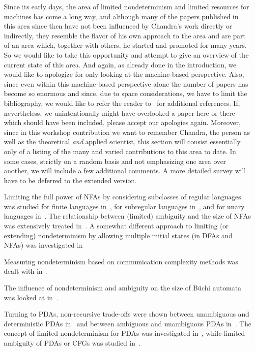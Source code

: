 \documentclass[copyright]{eptcs}
\begin{document}
Since its early days, the area of limited nondeterminism 
and limited resources for machines has come a long way, 
and although many of the papers published in this area since 
then have not been influenced by Chandra's work 
directly or indirectly, they resemble the flavor 
of his own approach to the area and are part of an area which, 
together with others, he started and promoted for many years. 
So we would like to take this opportunity and attempt to 
give an overview of the current state of this area. 
And again, as already done in the introduction, we would like to 
apologize for only looking at the machine-based perspective. 
Also, since even within this machine-based perspective 
alone the number of papers has become so enormous and since, due to space considerations, we have to limit the bibliography,
we would like to refer the reader to~\cite{Dassow09,GoldstineKKLMW02} for additional references. If, nevertheless,
we unintentionally might have overlooked a paper here or there 
which should have been included, please accept our apologies again. Moreover, since in this workshop contribution we
want to remember Chandra, the person as well as the theoretical \emph{and} applied 
scientist, this section will consist 
essentially only of a listing of the many and varied contributions to this area to date. In some cases,
strictly on a random basis and not emphasizing one area over another, we will include a few additional comments. 
A more detailed survey will have to be deferred to the extended version.

Limiting the full power of NFAs by considering 
subclasses of regular languages was studied for finite 
languages in~\cite{Mandl73,SalomaaY97}, for subregular languages in~\cite{BordihnHK09}, and for unary languages 
in~\cite{Chrobak86,Chrobak03,MereghettiP00}. The relationship 
between (limited) ambiguity and the size of NFAs was extensively 
treated in~\cite{GoldstineLW92,HromkovicS09,Leung98,Leung98-2,Leung05,Leung06,RavikumarI89,StearnsH85}. A somewhat 
different approach to limiting (or extending) nondeterminism by allowing multiple initial states (in DFAs and NFAs) was 
investigated in \cite{GillK74,HolzerSY01,Kappes99,VelosoG79}

Measuring nondeterminism based on communication complexity methods was dealt with in~\cite{HromkovicKKSS02}. 

The influence of nondeterminism and ambiguity on the size of B{\"u}chi automata was looked at in~\cite{Niessner04}. 

Turning to PDAs, non-recursive trade-offs were shown between unambiguous and deterministic PDAs in~\cite{Valiant76} and 
between ambiguous and unambiguous PDAs  in~\cite{SchmidtS77}. The concept of limited nondeterminism for PDAs was 
investigated in~\cite{GoldstineLW05,Herzog97,Herzog99,MrazPO07,SalomaaWY94,SalomaaY93,SalomaaY94,VermeirS81}, while 
limited ambiguity of PDAs or CFGs was studied in~\cite{Herzog97,Herzog99,Wich00,Wich01,Wich05}. 
\end{document}
